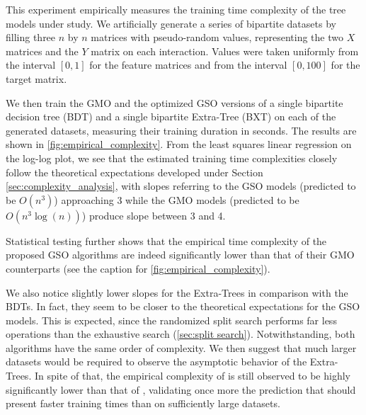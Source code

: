 This experiment empirically measures the training time complexity of the tree models under study. We artificially generate a series of bipartite datasets by filling three $n$ by $n$ matrices with pseudo-random values, representing the two $X$ matrices and the $Y$ matrix on each interaction. Values were taken uniformly from the interval $[0, 1]$ for the feature matrices and from the interval $[0, 100]$ for the target matrix.

We then train the GMO and the optimized GSO versions of a single bipartite decision tree (BDT) and a single bipartite Extra-Tree (BXT) on each of the generated datasets, measuring their training duration in seconds. The results are shown in \autoref{fig:empirical_complexity}. From the least squares linear regression on the log-log plot, we see that the estimated training time complexities closely follow the theoretical expectations developed under Section \ref{sec:complexity_analysis}, with slopes referring to the GSO models (predicted to be $O(n^3)$) approaching 3 while the GMO models (predicted to be $O(n^3\log(n))$) produce slope between 3 and 4.

Statistical testing further shows that the empirical time complexity of the proposed GSO algorithms are indeed significantly lower than that of their GMO counterparts (see the caption for \autoref{fig:empirical_complexity}).


We also notice slightly lower slopes for the Extra-Trees in comparison with the BDTs. In fact, they seem to be closer to the theoretical expectations for the GSO models. This is expected,
since the randomized split search performs far less operations than the exhaustive search (\autoref{sec:split search}). Notwithstanding, both algorithms have the same order of complexity.
%
We then suggest that much larger datasets would be required to observe the asymptotic behavior of the Extra-Trees.
In spite of that, the empirical complexity of  is still observed to be highly significantly lower than that of , validating once more the prediction that  should present faster training times than  on sufficiently large datasets.

